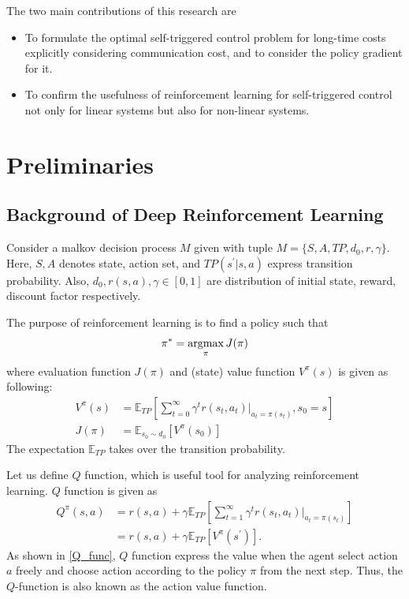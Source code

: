 \documentclass[english, dvipdfmx]{ampmt}             %
\newcommand{\argmax}{\mathop{\rm argmax}\limits}
\newcommand{\expect}{\mathbb{E}}
\begin{document}
The two main contributions of this research are
\begin{itemize}
	\item To formulate the optimal self-triggered control problem for long-time costs explicitly considering communication cost, and to consider the policy gradient for it.
	\item To confirm the usefulness of reinforcement learning for self-triggered control not only for linear systems but also for non-linear systems.
\end{itemize}

\section{Preliminaries}
\subsection{Background of Deep Reinforcement Learning}
Consider a malkov decision process $M$ given with tuple $M=\{S,A,TP,d_0,r,\gamma\}$. Here, $S,A$ denotes state, action set, and $TP(s^{'}|s,a)$ express transition probability. Also, $d_0,r(s,a),\gamma\in[0,1]$ are distribution of initial state, reward, discount factor respectively. \par
The purpose of reinforcement learning is to find a policy such that
\begin{equation}
	\pi^{*}=\argmax_{\pi}J(\pi) \label{purpose_of_rl}
\end{equation} 
where evaluation function $J(\pi)$ and (state) value function $V^{\pi}(s)$ is given as following:
\begin{align}
	V^{\pi}(s) &= \expect_{TP}\left[\sum_{t=0}^{\infty}\gamma^tr(s_t, a_t)|_{a_t=\pi(s_t)}, s_0 = s\right]\\
	J(\pi) &= \expect_{s_0\sim d_0}[V^{\pi}(s_0)]
\end{align}
The expectation $\expect_{TP}$ takes over the transition probability.\par
Let us define $Q$ function, which is useful tool for analyzing reinforcement learning. $Q$ function is given as 
\begin{align}
	Q^{\pi}(s,a) &= r(s, a) + \gamma\expect_{TP}\left[\sum_{t=1}^{\infty}\gamma^tr(s_t, a_t)|_{a_t=\pi(s_t)} \right]\nonumber\\
			    &= r(s, a) + \gamma \expect_{TP}[V^{\pi}(s^{\prime})]. \label{Q_func}
\end{align}
As shown in \eqref{Q_func}, $Q$ function express the value when the agent select action $a$ freely and choose action according to the policy $\pi$ from the next step. Thus, the $Q$-function is also known as the action value function.
\end{document}
